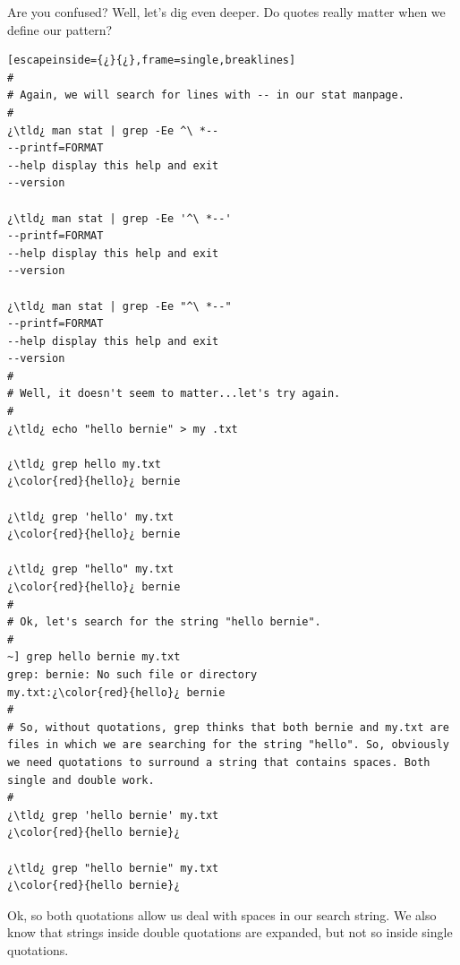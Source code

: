 Are you confused? Well, let's dig even deeper. Do quotes really matter when we define our pattern?

\begin{lstlisting}[escapeinside={¿}{¿},frame=single,breaklines]
#
# Again, we will search for lines with -- in our stat manpage.
#
¿\tld¿ man stat | grep -Ee ^\ *--
--printf=FORMAT
--help display this help and exit
--version

¿\tld¿ man stat | grep -Ee '^\ *--'
--printf=FORMAT
--help display this help and exit
--version

¿\tld¿ man stat | grep -Ee "^\ *--"
--printf=FORMAT
--help display this help and exit
--version
#
# Well, it doesn't seem to matter...let's try again.
#
¿\tld¿ echo "hello bernie" > my .txt

¿\tld¿ grep hello my.txt
¿\color{red}{hello}¿ bernie

¿\tld¿ grep 'hello' my.txt
¿\color{red}{hello}¿ bernie

¿\tld¿ grep "hello" my.txt
¿\color{red}{hello}¿ bernie
#
# Ok, let's search for the string "hello bernie".
#
~] grep hello bernie my.txt
grep: bernie: No such file or directory
my.txt:¿\color{red}{hello}¿ bernie
#
# So, without quotations, grep thinks that both bernie and my.txt are files in which we are searching for the string "hello". So, obviously we need quotations to surround a string that contains spaces. Both single and double work.
#
¿\tld¿ grep 'hello bernie' my.txt
¿\color{red}{hello bernie}¿

¿\tld¿ grep "hello bernie" my.txt
¿\color{red}{hello bernie}¿
\end{lstlisting}

Ok, so both quotations allow us deal with spaces in our search string. We also know that strings inside double quotations are expanded, but not so inside single quotations.


